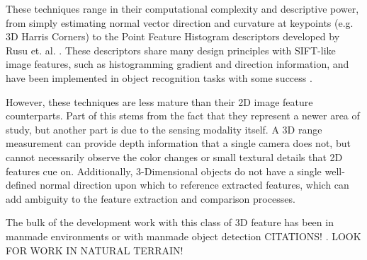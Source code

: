 These techniques range in their computational complexity and descriptive power, from simply estimating normal vector direction and curvature at keypoints (e.g. 3D Harris Corners) to the Point Feature Histogram descriptors developed by Rusu et. al. \cite{PFH}. These descriptors share many design principles with SIFT-like image features, such as histogramming gradient and direction information, and have been implemented in object recognition tasks with some success \cite{FPFH}.

However, these techniques are less mature than their 2D image feature counterparts. Part of this stems from the fact that they represent a newer area of study, but another part is due to the sensing modality itself. A 3D range measurement  can provide depth information that a single camera does not, but cannot necessarily observe the color changes or small textural details that 2D features cue on. Additionally, 3-Dimensional objects do not have a single well-defined normal direction upon which to reference extracted features, which can add ambiguity to the feature extraction and comparison processes. 

The bulk of the development work with this class of 3D feature has been in manmade environments or with manmade object detection \cite{??} CITATIONS! . LOOK FOR WORK IN NATURAL TERRAIN!


